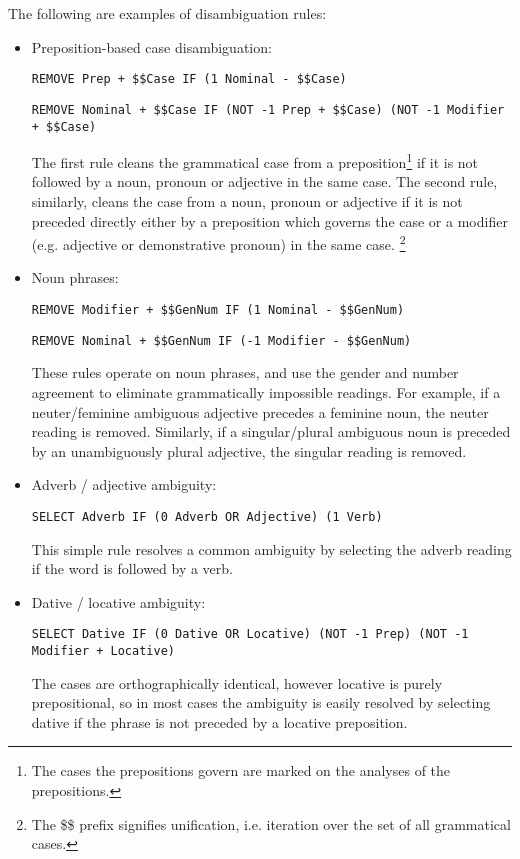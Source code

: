 \documentclass{book}
\begin{document}
The following are examples of disambiguation rules:
\begin{itemize}
\item Preposition-based case disambiguation:\nopagebreak

\texttt{REMOVE Prep + \$\$Case IF (1 Nominal - \$\$Case)}

\texttt{REMOVE Nominal + \$\$Case IF (NOT -1 Prep + \$\$Case) (NOT -1 Modifier + \$\$Case)}

The first rule cleans the grammatical case from a preposition\footnote{The cases the prepositions govern
are marked on the analyses of the prepositions.} 
if it is not followed by a noun, pronoun or adjective in the same case. The second
rule, similarly, cleans the case from a noun, pronoun or adjective if
it is not preceded directly either by a preposition which governs the case
or a modifier (e.g. adjective or demonstrative pronoun) in the same case.
\footnote{The \$\$ prefix signifies unification, i.e. iteration over the set of all
grammatical cases.}

\item Noun phrases:

\texttt{REMOVE Modifier + \$\$GenNum IF (1 Nominal - \$\$GenNum)}

\texttt{REMOVE Nominal + \$\$GenNum IF (-1 Modifier - \$\$GenNum)}

These rules operate on noun phrases, and use the gender and number agreement
to eliminate grammatically impossible readings. For example, 
if a neuter/feminine ambiguous adjective precedes a feminine noun, the neuter
reading is removed. Similarly, if a singular/plural ambiguous noun is preceded
by an unambiguously plural adjective, the singular reading is removed.

\item Adverb / adjective ambiguity:

\texttt{SELECT Adverb IF (0 Adverb OR Adjective) (1 Verb)}

This simple rule resolves a common ambiguity by selecting the adverb reading if the word is followed by a verb.

\item Dative / locative ambiguity:

\texttt{SELECT Dative IF (0 Dative OR Locative) (NOT -1 Prep) (NOT -1 Modifier + Locative)}

The cases are orthographically identical, however locative
is purely prepositional, so in most cases the ambiguity is easily
resolved by selecting dative if the phrase
is not preceded by a locative preposition.

\end{itemize}
\end{document}
